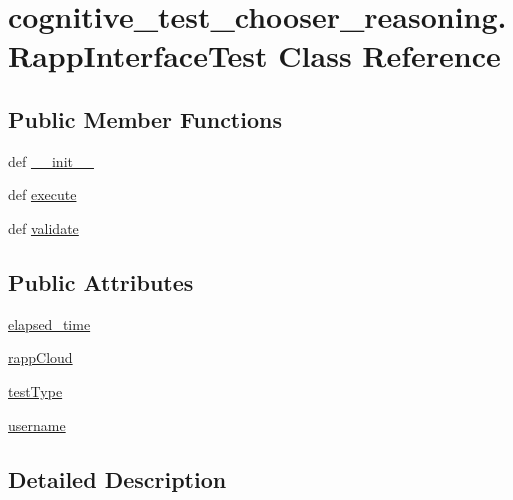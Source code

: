 \hypertarget{classcognitive__test__chooser__reasoning_1_1RappInterfaceTest}{\section{cognitive\-\_\-test\-\_\-chooser\-\_\-reasoning.\-Rapp\-Interface\-Test Class Reference}
\label{classcognitive__test__chooser__reasoning_1_1RappInterfaceTest}
}
\subsection*{Public Member Functions}
\begin{DoxyCompactItemize}
\item 
def \hyperlink{classcognitive__test__chooser__reasoning_1_1RappInterfaceTest_ac25df76f8f5675d525bd31e7d2f27ac9}{\-\_\-\-\_\-init\-\_\-\-\_\-}
\item 
def \hyperlink{classcognitive__test__chooser__reasoning_1_1RappInterfaceTest_abaee1ad9f7d154c08c16668b038cacca}{execute}
\item 
def \hyperlink{classcognitive__test__chooser__reasoning_1_1RappInterfaceTest_a9009a0de9d6243fbf4510b8267e9757a}{validate}
\end{DoxyCompactItemize}
\subsection*{Public Attributes}
\begin{DoxyCompactItemize}
\item 
\hyperlink{classcognitive__test__chooser__reasoning_1_1RappInterfaceTest_ad333825f01ed8ef7006234a6426a8ccb}{elapsed\-\_\-time}
\item 
\hyperlink{classcognitive__test__chooser__reasoning_1_1RappInterfaceTest_ae5deb3207a2da791de467b71d66703d2}{rapp\-Cloud}
\item 
\hyperlink{classcognitive__test__chooser__reasoning_1_1RappInterfaceTest_ac7bcb0848f2f4fb81c39f6504cc66980}{test\-Type}
\item 
\hyperlink{classcognitive__test__chooser__reasoning_1_1RappInterfaceTest_a23aab8af050f77cdc6657f685e79b92d}{username}
\end{DoxyCompactItemize}


\subsection{Detailed Description}


